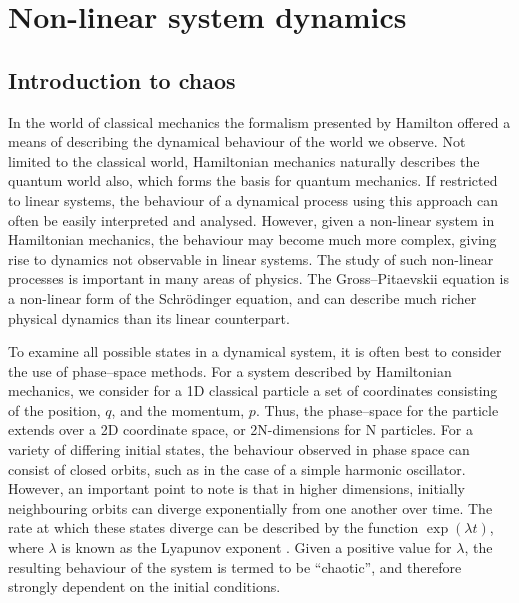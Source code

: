 \section{Non-linear system dynamics}\label{sec:chaos}
\subsection{Introduction to chaos}
In the world of classical mechanics the formalism presented by Hamilton offered a means of describing the dynamical behaviour of the world we observe. Not limited to the classical world, Hamiltonian mechanics naturally describes the quantum world also, which forms the basis for quantum mechanics. If restricted to linear systems, the behaviour of a dynamical process using this approach
can often be easily interpreted and analysed. However, given a non-linear system in Hamiltonian mechanics, the behaviour may become much more complex, giving rise to dynamics not observable in linear systems. The study of such non-linear processes is important in many areas of physics. The Gross--Pitaevskii equation is a non-linear form of the Schr\"{o}dinger equation, and can describe much richer physical dynamics than its linear counterpart.

To examine all possible states in a dynamical system, it is often best to consider the use of phase--space methods. For a system described by Hamiltonian mechanics, we consider for a 1D classical particle a set of coordinates consisting of the position, $q$, and the momentum, $p$. Thus, the phase--space for the particle extends over a 2D coordinate space, or 2N-dimensions for N particles. For a variety of differing initial states, the behaviour observed in phase space can consist of closed orbits, such as in the case of a simple harmonic oscillator. However, an important point to note is that in higher dimensions, initially neighbouring orbits can diverge exponentially from one another over time. The rate at which these states diverge can be described by the function $\exp(\lambda t)$, where $\lambda$ is known as the Lyapunov exponent \cite{BK:Kibble_2004}. Given a positive value for $\lambda$, the resulting behaviour of the system is termed to be ``chaotic'', and therefore strongly dependent on the initial conditions.

